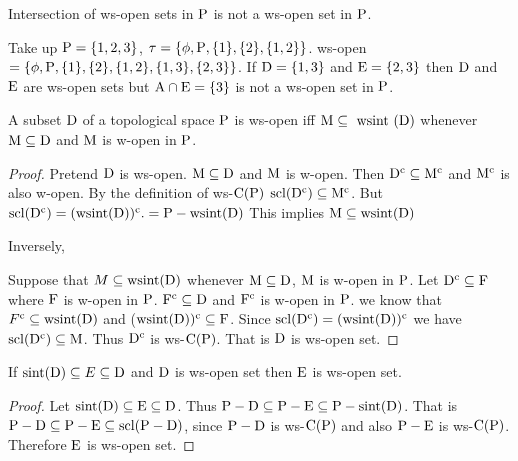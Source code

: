 \begin{rem}\label{rem2.3.4}
Intersection of ws-open sets in $\mathrm{P}$ is not a ws-open set in $\mathrm{P}$.
\end{rem}

\begin{exm}\label{exam2.3.5}
Take up $\mathrm{P} = \{1,2, 3\}$, $\tau = \{\phi, \mathrm{P}, \{1\}, \{2\}, \{1, 2\}\}$. ws-open $= \{\phi, \mathrm{P}, \{1\}, \{2\}, \{1, 2\},\{1,3\},\{2,3\}\}$. If $\mathrm{D}= \{1,3\}$ and $\mathrm{E}=\{2,3\}$ then $\mathrm{D}$ and $\mathrm{E}$ are ws-open sets but $\mathrm{A}\cap \mathrm{E}=\{3\}$ is not a ws-open set in $\mathrm{P}$.
\end{exm}

\begin{thm}\label{thm2.3.6}
A subset $\mathrm{D}$ of a topological space $\mathrm{P}$ is ws-open iff $\TSM\subseteq  \text{ wsint } (\clrD)$ whenever $\mathrm{M}\subseteq \mathrm{D}$ and $\mathrm{M}$ is w-open in $\mathrm{P}$.
\end{thm}

\begin{proof}
Pretend $\mathrm{D}$ is ws-open. $\mathrm{M}\subseteq \mathrm{D}$ and $\mathrm{M}$ is w-open. Then $\mathrm{D}^{\text{c}} \subseteq \mathrm{M}^{\text{c}}$ and $\mathrm{M}^{\text{c}}$ is also w-open. By the definition of ws-$\mathrm{C}(\mathrm{P})$ $\mathrm{scl}(\mathrm{D}^{\text{c}})\subseteq \mathrm{M}^{\text{c}}$. But $\mathrm{scl}(\mathrm{D}^{\text{c}})=(\text{wsint}(\mathrm{D}))^{\text{c}}.=\mathrm{P}-\text{wsint}(\mathrm{D})$ This implies $\TSM\subseteq \text{wsint}(\clrD)$ 

Inversely,

Suppose that $M\subseteq  \mathrm{wsint}(\mathrm{D})$ whenever $\mathrm{M}\subseteq \mathrm{D}$, $\mathrm{M}$ is w-open in $\mathrm{P}$. Let $\mathrm{D}^{\text{c}} \subseteq \mathrm{F}$ where $\mathrm{F}$ is w-open in $\mathrm{P}$. $\mathrm{F}^{\text{c}} \subseteq \mathrm{D}$ and $\mathrm{F}^{\text{c}}$ is w-open in $\mathrm{P}$. we know that $F^{\text{c}} \subseteq \mathrm{wsint}(\mathrm{D})$ and ($\mathrm{wsint}(\mathrm{D}))^{\text{c}} \subseteq \mathrm{F}$. Since $\mathrm{scl}(\mathrm{D}^{\text{c}})= (\mathrm{wsint}(\mathrm{D}))^{\text{c}}$ we have $\mathrm{scl}(\mathrm{D}^{\text{c}})\subseteq \mathrm{M}$. Thus $\mathrm{D}^{\text{c}}$ is ws-$\mathrm{C}(\mathrm{P})$. That is $\mathrm{D}$ is ws-open set.
\end{proof}

\begin{thm}\label{thm2.2.4}
If $\mathrm{sint}(\mathrm{D})\subseteq E\subseteq \mathrm{D}$ and $\mathrm{D}$ is ws-open set then $\mathrm{E}$ is ws-open set.
\end{thm}

\begin{proof}
Let $\mathrm{sint}(\mathrm{D})\subseteq \mathrm{E}\subseteq \mathrm{D}$. Thus $\mathrm{P}-\mathrm{D}\subseteq \mathrm{P}-\mathrm{E}\subseteq \mathrm{P}-\mathrm{sint}(\mathrm{D})$. That is $\mathrm{P}-\mathrm{D}\subseteq \mathrm{P}-\mathrm{E}\subseteq \mathrm{scl}(\mathrm{P}-\mathrm{D})$, since $\mathrm{P}-\mathrm{D}$ is ws-$\mathrm{C}(\mathrm{P})$ and also $\mathrm{P}-\mathrm{E}$ is ws-$\mathrm{C}(\mathrm{P})$. Therefore $\mathrm{E}$  is ws-open set.
\end{proof}

